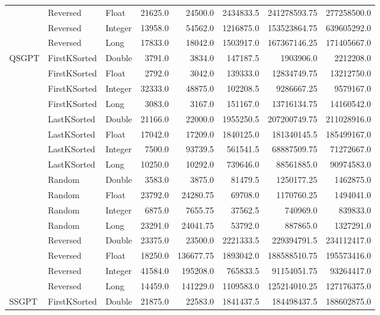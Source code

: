 \documentclass[unicode,11pt,a4paper,oneside,numbers=endperiod,openany]{scrartcl}
\begin{document}
\begin{center}
\begin{longtable}{|l|l|l|r|r|r|r|r|}
            & Reversed & Float & 21625.0 & 24500.0 & 2434833.5 & 241278593.75 & 277258500.0 \\
            & Reversed & Integer & 13958.0 & 54562.0 & 1216875.0 & 153523864.75 & 639605292.0 \\
            & Reversed & Long & 17833.0 & 18042.0 & 1503917.0 & 167367146.25 & 171405667.0 \\
            \hline
            \multirow{16}{*}{QSGPT} & FirstKSorted & Double & 3791.0 & 3834.0 & 147187.5 & 1903906.0 & 2212208.0 \\
            & FirstKSorted & Float & 2792.0 & 3042.0 & 139333.0 & 12834749.75 & 13212750.0 \\
            & FirstKSorted & Integer & 32333.0 & 48875.0 & 102208.5 & 9286667.25 & 9579167.0 \\
            & FirstKSorted & Long & 3083.0 & 3167.0 & 151167.0 & 13716134.75 & 14160542.0 \\
            & LastKSorted & Double & 21166.0 & 22000.0 & 1955250.5 & 207200749.75 & 211028916.0 \\
            & LastKSorted & Float & 17042.0 & 17209.0 & 1840125.0 & 181340145.5 & 185499167.0 \\
            & LastKSorted & Integer & 7500.0 & 93739.5 & 561541.5 & 68887509.75 & 71272667.0 \\
            & LastKSorted & Long & 10250.0 & 10292.0 & 739646.0 & 88561885.0 & 90974583.0 \\
            & Random & Double & 3583.0 & 3875.0 & 81479.5 & 1250177.25 & 1462875.0 \\
            & Random & Float & 23792.0 & 24280.75 & 69708.0 & 1170760.25 & 1494041.0 \\
            & Random & Integer & 6875.0 & 7655.75 & 37562.5 & 740969.0 & 839833.0 \\
            & Random & Long & 23291.0 & 24041.75 & 53792.0 & 887865.0 & 1327291.0 \\
            & Reversed & Double & 23375.0 & 23500.0 & 2221333.5 & 229394791.5 & 234112417.0 \\
            & Reversed & Float & 18250.0 & 136677.75 & 1893042.0 & 188588510.75 & 195573416.0 \\
            & Reversed & Integer & 41584.0 & 195208.0 & 765833.5 & 91154051.75 & 93264417.0 \\
            & Reversed & Long & 14459.0 & 141229.0 & 1109583.0 & 125214010.25 & 127176375.0 \\
            \hline
            \multirow{16}{*}{SSGPT} & FirstKSorted & Double & 21875.0 & 22583.0 & 1841437.5 & 184498437.5 & 188602875.0 \\

\end{longtable}
\end{center}
\end{document}
